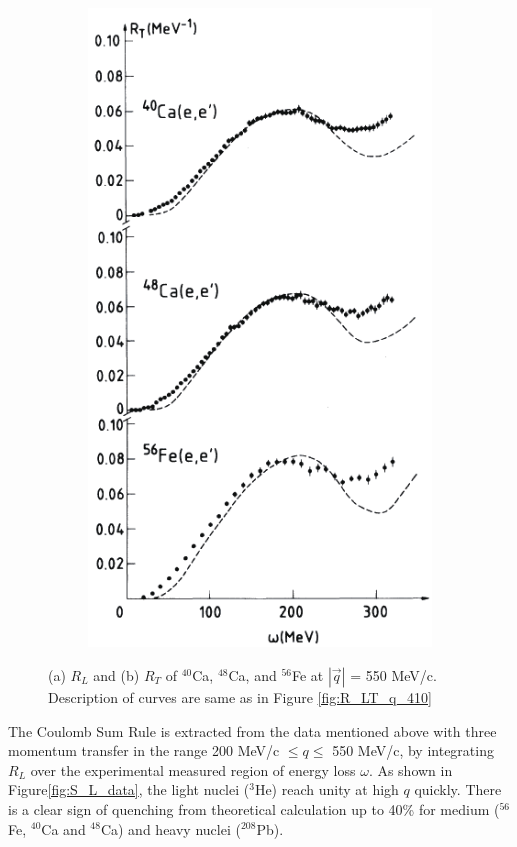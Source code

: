 \begin{figure}
\begin{subfigure}{.5\textwidth}
\includegraphics[width=.8\linewidth]{figs/R_T_q_550.png}
\label{fig:R_T_q_550}
\end{subfigure}
\caption[R LT q 550]{
(a) $R_L$ and (b) $R_T$ of $^{40}$Ca, $^{48}$Ca, and $^{56}$Fe at $|\vec{q}|$ = 550 MeV/c.
Description of curves are same as in Figure \ref{fig:R_LT_q_410}
\label{fig:R_LT_q_550}}
\end{figure}

The Coulomb Sum Rule is extracted from the data mentioned above with three momentum transfer in the range
200 MeV/c $\leq q \leq$ 550 MeV/c, by integrating $R_L$ over the experimental measured region of energy loss
$\omega$. As shown in Figure\ref{fig:S_L_data}, the light nuclei ($^{3}$He) reach unity at high $q$ quickly.
There is a clear sign of quenching from theoretical calculation up to 40\% for medium ($^{56}$Fe, $^{40}$Ca and
$^{48}$Ca) and heavy nuclei ($^{208}$Pb).

